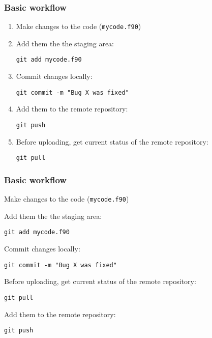 \documentclass[xcolor=dvipsnames,10pt]{beamer}
\begin{document}
\begin{frame}
 \frametitle{Basic workflow}
 
 \begin{enumerate}
  \item Make changes to the code  (\texttt{mycode.f90})
  \vspace*{0.2cm}
  
  \item Add them the the staging area: 
  
  \texttt{git add mycode.f90}
  \vspace*{0.2cm}
  
  \item Commit changes locally:
  
  \texttt{git commit -m "Bug X was fixed"}
  \vspace*{0.2cm}
  
  \item Add them to the remote repository:
  
  \texttt{git push}
     \vspace*{0.2cm}
  
  \color{white}
  \item[] Before uploading, get current status of the remote repository:
  
  \texttt{git pull}
 \end{enumerate}

\end{frame}
\addtocounter{framenumber}{-1}
\begin{frame}
 \frametitle{Basic workflow}
 
 \begin{enumerate}
  \item Make changes to the code (\texttt{mycode.f90})
  \vspace*{0.2cm}
  
  \item Add them the the staging area: 
  
  \texttt{git add mycode.f90} 
  \vspace*{0.2cm}
  
  \item Commit changes locally:
  
  \texttt{git commit -m "Bug X was fixed"}
  \vspace*{0.2cm}
  
  {
  \color{blue}
  \item[*] Before uploading, get current status of the remote repository:
  
  \texttt{git pull}
  }
  \vspace*{0.2cm}
  
  
  \item Add them to the remote repository:
  
  \texttt{git push}
 \end{enumerate}

\end{frame}
\end{document}
